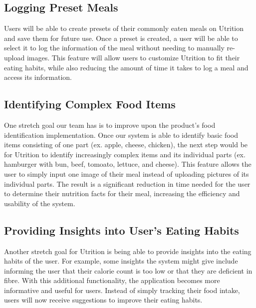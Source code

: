 \documentclass{article}
\begin{document}
\subsection{Logging Preset Meals}

Users will be able to create presets of their commonly eaten meals on Utrition and save them for future use. Once a preset is created, a user will be able to select it to log the information of the meal without needing to manually re-upload images. This feature will allow users to customize Utrition to fit their eating habits, while also reducing the amount of time it takes to log a meal and access its information.

\subsection{Identifying Complex Food Items}

One stretch goal our team has is to improve upon the product's food identification implementation. Once our system is able to identify basic food items consisting of one part (ex. apple, cheese, chicken), the next step would be for Utrition to identify increasingly complex items and its individual parts (ex. hamburger with bun, beef, tomoato, lettuce, and cheese). This feature allows the user to simply input one image of their meal instead of uploading pictures of its individual parts. The result is a significant reduction in time needed for the user to determine their nutrition facts for their meal, increasing the efficiency and usability of the system.

\subsection{Providing Insights into User's Eating Habits}

Another stretch goal for Utrition is being able to provide insights into the eating habits of the user. For example, some insights the system might give include informing the user that their calorie count is too low or that they are deficient in fibre. With this additional functionality, the application becomes more informative and useful for users. Instead of simply tracking their food intake, users will now receive suggestions to improve their eating habits.
\end{document}
